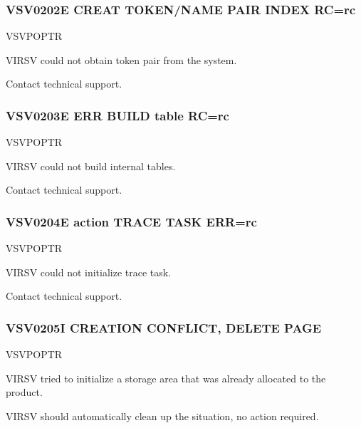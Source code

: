 \documentclass[letterpaper,10pt,english]{sphinxmanual}
\begin{document}
\subsubsection{VSV0202E CREAT TOKEN/NAME PAIR INDEX RC=rc}
\label{\detokenize{messages:vsv0202e-creat-token-name-pair-index-rc-rc}}\begin{description}
\sphinxAtStartPar
VSVPOPTR

\sphinxAtStartPar
VIRSV could not obtain token pair from the system.

\sphinxAtStartPar
Contact technical support.

\end{description}


\subsubsection{VSV0203E ERR BUILD table RC=rc}
\label{\detokenize{messages:vsv0203e-err-build-table-rc-rc}}\begin{description}
\sphinxAtStartPar
VSVPOPTR

\sphinxAtStartPar
VIRSV could not build internal tables.

\sphinxAtStartPar
Contact technical support.

\end{description}


\subsubsection{VSV0204E action TRACE TASK ERR=rc}
\label{\detokenize{messages:vsv0204e-action-trace-task-err-rc}}\begin{description}
\sphinxAtStartPar
VSVPOPTR

\sphinxAtStartPar
VIRSV could not initialize trace task.

\sphinxAtStartPar
Contact technical support.

\end{description}


\subsubsection{VSV0205I CREATION CONFLICT, DELETE PAGE}
\label{\detokenize{messages:vsv0205i-creation-conflict-delete-page}}\begin{description}
\sphinxAtStartPar
VSVPOPTR

\sphinxAtStartPar
VIRSV tried to initialize a storage area that was already allocated to the product.

\sphinxAtStartPar
VIRSV should automatically clean up the situation, no action required.

\end{description}
\end{document}
